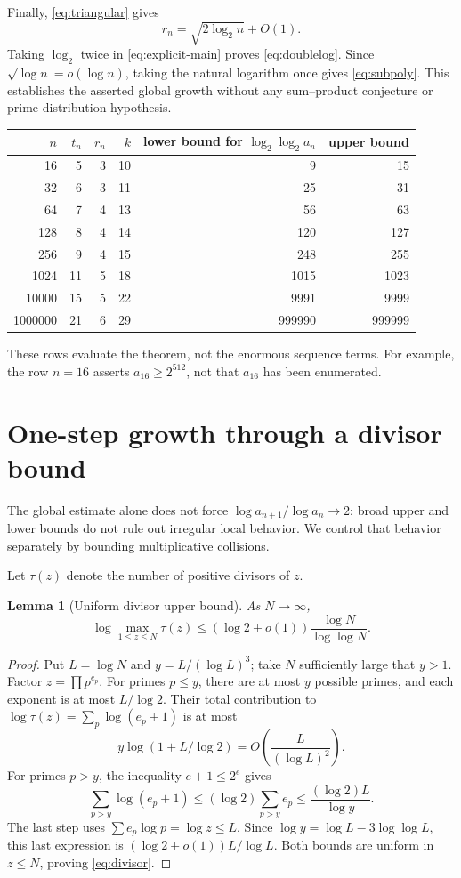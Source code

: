 \documentclass[11pt,a4paper]{article}
\newtheorem{lemma}[theorem]{Lemma}
\theoremstyle{definition}
\theoremstyle{remark}
\renewcommand{\lg}{\log_2}
\begin{document}
Finally, \eqref{eq:triangular} gives
\[
 r_n=\sqrt{2\lg n}+O(1).
\]
Taking $\lg$ twice in \eqref{eq:explicit-main} proves
\eqref{eq:doublelog}. Since $\sqrt{\log n}=o(\log n)$, taking the natural
logarithm once gives \eqref{eq:subpoly}.
This establishes the asserted global growth without any sum--product
conjecture or prime-distribution hypothesis.

\begin{center}
\begin{tabular}{r r r r r r}
\toprule
$n$ & $t_n$ & $r_n$ & $k$ & lower bound for $\lg\lg a_n$
 & upper bound\\
\midrule
16 & 5 & 3 & 10 & 9 & 15\\
32 & 6 & 3 & 11 & 25 & 31\\
64 & 7 & 4 & 13 & 56 & 63\\
128 & 8 & 4 & 14 & 120 & 127\\
256 & 9 & 4 & 15 & 248 & 255\\
1024 & 11 & 5 & 18 & 1015 & 1023\\
10000 & 15 & 5 & 22 & 9991 & 9999\\
1000000 & 21 & 6 & 29 & 999990 & 999999\\
\bottomrule
\end{tabular}
\end{center}
These rows evaluate the theorem, not the enormous sequence terms.
For example, the row $n=16$ asserts $a_{16}\ge2^{512}$, not that $a_{16}$
has been enumerated.

\section{One-step growth through a divisor bound}\label{sec:local}
The global estimate alone does not force
$\log a_{n+1}/\log a_n\to2$: broad upper and lower bounds do not rule out
irregular local behavior. We control that behavior separately by bounding
multiplicative collisions.

Let $\tau(z)$ denote the number of positive divisors of $z$.
\begin{lemma}[Uniform divisor upper bound]\label{lem:divisor}
As $N\to\infty$,
\begin{equation}\label{eq:divisor}
 \log\max_{1\le z\le N}\tau(z)
 \le(\log2+o(1))\frac{\log N}{\log\log N}.
\end{equation}
\end{lemma}
\begin{proof}
Put $L=\log N$ and $y=L/(\log L)^3$; take $N$ sufficiently large that
$y>1$. Factor $z=\prod p^{e_p}$. For primes $p\le y$, there are at most
$y$ possible primes, and each exponent is at most $L/\log2$. Their total
contribution to $\log\tau(z)=\sum_p\log(e_p+1)$ is at most
\[
 y\log(1+L/\log2)
 =O\!\left(\frac{L}{(\log L)^2}\right).
\]
For primes $p>y$, the inequality $e+1\le2^e$ gives
\[
 \sum_{p>y}\log(e_p+1)
 \le(\log2)\sum_{p>y}e_p
 \le\frac{(\log2)L}{\log y}.
\]
The last step uses $\sum e_p\log p=\log z\le L$.
Since $\log y=\log L-3\log\log L$, this last expression is
$(\log2+o(1))L/\log L$. Both bounds are uniform in $z\le N$,
proving \eqref{eq:divisor}.
\end{proof}
\end{document}
